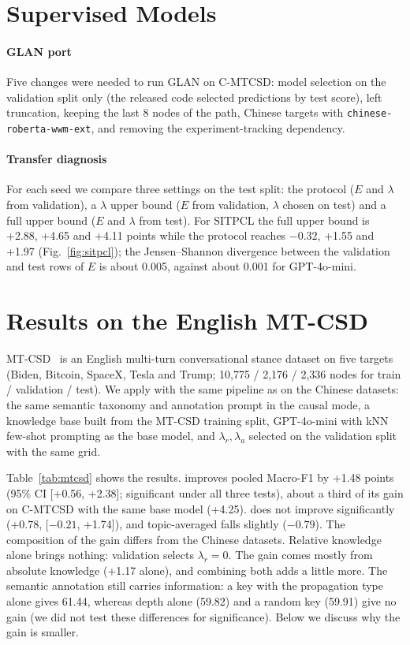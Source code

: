 \section{Supervised Models}
\label{app:supervised}

\paragraph{GLAN port}
Five changes were needed to run GLAN on C-MTCSD: model selection on the validation split only (the released code selected predictions by test score), left truncation, keeping the last 8 nodes of the path, Chinese targets with \texttt{chinese-roberta-wwm-ext}, and removing the experiment-tracking dependency.

\paragraph{Transfer diagnosis}
For each seed we compare three settings on the test split: the protocol ($E$ and $\lambda$ from validation), a $\lambda$ upper bound ($E$ from validation, $\lambda$ chosen on test) and a full upper bound ($E$ and $\lambda$ from test). For SITPCL the full upper bound is +2.88, +4.65 and +4.11 points while the protocol reaches $-0.32$, +1.55 and +1.97 (Fig.~\ref{fig:sitpcl}); the Jensen--Shannon divergence between the validation and test rows of $E$ is about 0.005, against about 0.001 for GPT-4o-mini.

\section{Results on the English MT-CSD}
\label{app:mtcsd}

MT-CSD~\cite{mtcsd} is an English multi-turn conversational stance dataset on five targets (Biden, Bitcoin, SpaceX, Tesla and Trump; 10,775 / 2,176 / 2,336 nodes for train / validation / test). We apply \spin{} with the same pipeline as on the Chinese datasets: the same semantic taxonomy and annotation prompt in the causal mode, a knowledge base built from the MT-CSD training split, GPT-4o-mini with kNN few-shot prompting as the base model, and $\lambda_r,\lambda_a$ selected on the validation split with the same grid.

Table~\ref{tab:mtcsd} shows the results. \spin{} improves pooled Macro-F1 by +1.48 points (95\% CI [+0.56, +2.38]; significant under all three tests), about a third of its gain on C-MTCSD with the same base model (+4.25). \favg{} does not improve significantly (+0.78, [$-0.21$, +1.74]), and topic-averaged \favg{} falls slightly ($-0.79$). The composition of the gain differs from the Chinese datasets. Relative knowledge alone brings nothing: validation selects $\lambda_r = 0$. The gain comes mostly from absolute knowledge (+1.17 alone), and combining both adds a little more. The semantic annotation still carries information: a key with the propagation type alone gives 61.44, whereas depth alone (59.82) and a random key (59.91) give no gain (we did not test these differences for significance). Below we discuss why the gain is smaller.

